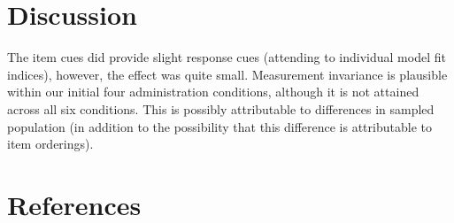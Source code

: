 \documentclass[
  man]{apa6}
\begin{document}
\hypertarget{discussion}{%
\section{Discussion}\label{discussion}}

The item cues did provide slight response cues (attending to individual model fit indices), however, the effect was quite small. Measurement invariance is plausible within our initial four administration conditions, although it is not attained across all six conditions. This is possibly attributable to differences in sampled population (in addition to the possibility that this difference is attributable to item orderings).

\newpage

\hypertarget{references}{%
\section{References}\label{references}}

\begingroup
\setlength{\parindent}{-0.5in}
\setlength{\leftskip}{0.5in}
\end{document}
